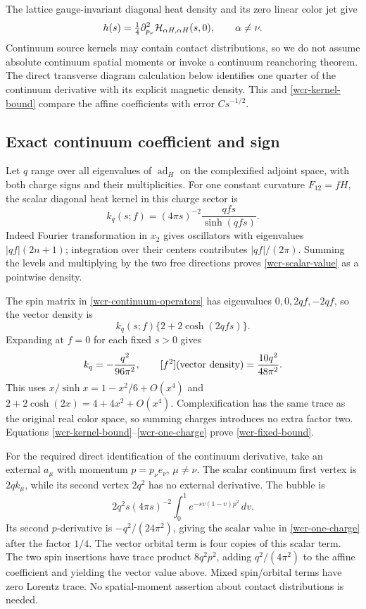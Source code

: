 The lattice gauge-invariant diagonal heat density and its zero linear
color jet give
\begin{equation}
 h(s)=\tfrac14\partial_{p_\nu}^2
              {\cal H}_{\alpha H,\alpha H}(s,0),\qquad\alpha\ne\nu.
 \label{wcr-density-factor}
\end{equation}
Continuum source kernels may contain contact distributions, so we do
not assume absolute continuum spatial moments or invoke a continuum
reanchoring theorem. The direct transverse diagram calculation below
identifies one quarter of the continuum derivative with its explicit
magnetic density. This and \eqref{wcr-kernel-bound} compare the affine
coefficients with error \(Cs^{-1/2}\).

\subsection{Exact continuum coefficient and sign}
\label{wcr-value-section}

Let \(q\) range over all eigenvalues of \(\operatorname{ad}_H\) on the
complexified adjoint space, with both charge signs and their
multiplicities. For one constant curvature \(F_{12}=fH\), the scalar
diagonal heat kernel in this charge sector is
\begin{equation}
 k_q(s;f)=(4\pi s)^{-2}\frac{qfs}{\sinh(qfs)}.
 \label{wcr-scalar-value}
\end{equation}
Indeed Fourier transformation in \(x_2\) gives oscillators with
eigenvalues \(|qf|(2n+1)\); integration over their centers contributes
\(|qf|/(2\pi)\). Summing the levels and multiplying by the two free
directions proves \eqref{wcr-scalar-value} as a pointwise density.

The spin matrix in \eqref{wcr-continuum-operators} has eigenvalues
\(0,0,2qf,-2qf\), so the vector density is
\[
 k_q(s;f)\{2+2\cosh(2qfs)\}.
\]
Expanding at \(f=0\) for each fixed \(s>0\) gives
\begin{equation}
 [f^2]k_q=-\frac{q^2}{96\pi^2},\qquad
 [f^2](\hbox{vector density})=\frac{10q^2}{48\pi^2}.
 \label{wcr-one-charge}
\end{equation}
This uses \(x/\sinh x=1-x^2/6+O(x^4)\) and
\(2+2\cosh(2x)=4+4x^2+O(x^4)\).
Complexification has the same trace as the original real color space,
so summing charges introduces no extra factor two.
Equations \eqref{wcr-kernel-bound}--\eqref{wcr-one-charge}
prove \eqref{wcr-fixed-bound}.

For the required direct identification of the continuum derivative,
take an external
\(a_\mu\) with momentum \(p=p_\nu e_\nu\), \(\mu\ne\nu\).
The scalar continuum first vertex is \(2qk_\mu\), while its second
vertex \(2q^2\) has no external derivative. The bubble is
\[
 2q^2s(4\pi s)^{-2}\int_0^1e^{-sv(1-v)p^2}\,dv.
\]
Its second \(p\)-derivative is \(-q^2/(24\pi^2)\), giving the scalar
value in \eqref{wcr-one-charge} after the factor \(1/4\).
The vector orbital term is four copies of this scalar term.
The two spin insertions have trace product \(8q^2p^2\), adding
\(q^2/(4\pi^2)\) to the affine coefficient and yielding the vector
value above. Mixed spin/orbital terms have zero Lorentz trace.
No spatial-moment assertion about contact distributions is needed.

